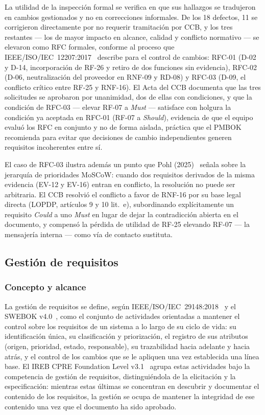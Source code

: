 \documentclass[journal,onecolumn]{IEEEtran}
\begin{document}
	La utilidad de la inspección formal se verifica en que sus
	hallazgos se tradujeron en cambios gestionados y no en
	correcciones informales. De los 18 defectos, 11 se corrigieron
	directamente por no requerir tramitación por CCB, y los tres
	restantes --- los de mayor impacto en alcance, calidad y conflicto
	normativo --- se elevaron como RFC formales, conforme al proceso
	que IEEE/ISO/IEC~12207:2017~\cite{ieee12207_2017} describe para el
	control de cambios: RFC-01 (D-02 y D-14, incorporación de RF-26 y
	retiro de dos funciones sin evidencia), RFC-02 (D-06,
	neutralización del proveedor en RNF-09 y RD-08) y RFC-03 (D-09, el
	conflicto crítico entre RF-25 y RNF-16). El Acta del CCB documenta
	que las tres solicitudes se aprobaron por unanimidad, dos de ellas
	con condiciones, y que la condición de RFC-03 --- elevar RF-07 a
	\emph{Must} --- satisface con holgura la condición ya aceptada en
	RFC-01 (RF-07 a \emph{Should}), evidencia de que el equipo evaluó
	los RFC en conjunto y no de forma aislada, práctica que el
	PMBOK~\cite{pmi2021} recomienda para evitar que decisiones de
	cambio independientes generen requisitos incoherentes entre sí.
	
	El caso de RFC-03 ilustra además un punto que Pohl
	(2025)~\cite{pohl2025} señala sobre la jerarquía de prioridades
	MoSCoW: cuando dos requisitos derivados de la misma evidencia
	(EV-12 y EV-16) entran en conflicto, la resolución no puede ser
	arbitraria. El CCB resolvió el conflicto a favor de RNF-16 por su
	base legal directa (LOPDP, artículos 9 y 10 lit.\ e), subordinando
	explícitamente un requisito \emph{Could} a uno \emph{Must} en
	lugar de dejar la contradicción abierta en el documento, y
	compensó la pérdida de utilidad de RF-25 elevando RF-07 --- la
	mensajería interna --- como vía de contacto sustituta.
	
	\subsection{Gestión de requisitos}
	\label{sec:gestion-teoria}
	
	\subsubsection{Concepto y alcance}
	
	La gestión de requisitos se define, según
	IEEE/ISO/IEC~29148:2018~\cite{ieee29148_2018} y el SWEBOK
	v4.0~\cite{swebok2024}, como el conjunto de actividades orientadas
	a mantener el control sobre los requisitos de un sistema a lo
	largo de su ciclo de vida: su identificación única, su
	clasificación y priorización, el registro de sus atributos
	(origen, prioridad, estado, responsable), su trazabilidad hacia
	adelante y hacia atrás, y el control de los cambios que se le
	apliquen una vez establecida una línea base. El IREB CPRE
	Foundation Level v3.1~\cite{ireb_v31} agrupa estas actividades bajo
	la competencia de gestión de requisitos, distinguiéndola de la
	elicitación y la especificación: mientras estas últimas se
	concentran en descubrir y documentar el contenido de los
	requisitos, la gestión se ocupa de mantener la integridad de ese
	contenido una vez que el documento ha sido aprobado.
	
\end{document}

